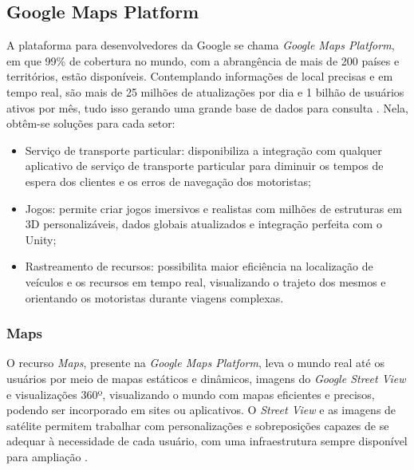 \newpage
\subsection{Google Maps Platform}

A plataforma para desenvolvedores da Google se chama \textit{Google Maps Platform}, em que 99\% de cobertura no mundo, com a abrangência de mais de 200 países e territórios, estão disponíveis. Contemplando informações de local precisas e em tempo real, são mais de 25 milhões de atualizações por dia e 1 bilhão de usuários ativos por mês, tudo isso gerando uma grande base de dados para consulta \cite{google:2019}. Nela, obtêm-se soluções para cada setor:
\begin{itemize}
    \item Serviço de transporte particular: disponibiliza a integração com qualquer aplicativo de serviço de transporte particular para diminuir os tempos de espera dos clientes e os erros de navegação dos motoristas;
    \item Jogos: permite criar jogos imersivos e realistas com milhões de estruturas em 3D personalizáveis, dados globais atualizados e integração perfeita com o Unity;
    \item Rastreamento de recursos: possibilita maior eficiência na localização de veículos e os recursos em tempo real, visualizando o trajeto dos mesmos e orientando os motoristas durante viagens complexas. 
\end{itemize}

\subsubsection{Maps}
O recurso \textit{Maps}, presente na \textit{Google Maps Platform}, leva o mundo real até os usuários por meio de mapas estáticos e dinâmicos, imagens do \textit{Google Street View} e visualizações 360º, visualizando o mundo com mapas eficientes e precisos, podendo ser incorporado em sites ou aplicativos. O \textit{Street View} e as imagens de satélite permitem  trabalhar com personalizações e sobreposições capazes de se adequar à necessidade de cada usuário, com uma infraestrutura sempre disponível para ampliação \cite{google:2019}. 

